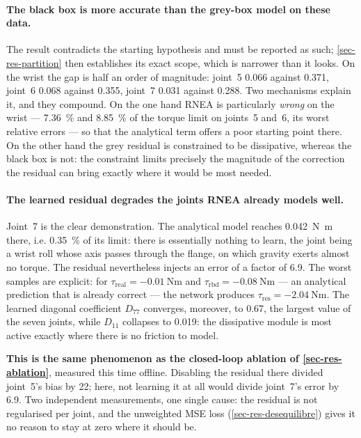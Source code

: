 \documentclass[a4paper, oneside]{article}
\newcommand{\taurbd}{\ensuremath{\tau_{\mathrm{rbd}}}}
\newcommand{\taures}{\ensuremath{\tau_{\mathrm{res}}}}
\begin{document}
\paragraph{The black box is more accurate than the grey-box model on these
data.} The result contradicts the starting hypothesis and must be reported as
such; \cref{sec-res-partition} then establishes its exact scope, which is
narrower than it looks. On the wrist the gap is half an order of magnitude:
joint~5 \num{0.066} against \num{0.371}, joint~6 \num{0.068} against
\num{0.355}, joint~7 \num{0.031} against \num{0.288}. Two mechanisms explain
it, and they compound. On the one hand RNEA is particularly \emph{wrong} on the
wrist --- \SI{7.36}{\percent} and \SI{8.85}{\percent} of the torque limit on
joints~5 and~6, its worst relative errors --- so that the analytical term
offers a poor starting point there. On the other hand the grey residual is
constrained to be dissipative, whereas the black box is not: the constraint
limits precisely the magnitude of the correction the residual can bring exactly
where it would be most needed.

\paragraph{The learned residual degrades the joints RNEA already models well.}
Joint~7 is the clear demonstration. The analytical model reaches
\SI{0.042}{\newton\meter} there, i.e. \SI{0.35}{\percent} of its limit: there
is essentially nothing to learn, the joint being a wrist roll whose axis passes
through the flange, on which gravity exerts almost no torque. The residual
nevertheless injects an error of a factor of \num{6.9}. The worst samples are
explicit: for $\tau_{\mathrm{real}} = \SI{-0.01}{\newton\meter}$ and
$\taurbd = \SI{-0.08}{\newton\meter}$ --- an analytical prediction that is
already correct --- the network produces $\taures =
\SI{-2.04}{\newton\meter}$. The learned diagonal coefficient $D_{77}$ converges,
moreover, to \num{0.67}, the largest value of the seven joints, while $D_{11}$
collapses to \num{0.019}: the dissipative module is most active exactly where
there is no friction to model.

\textbf{This is the same phenomenon as the closed-loop ablation of
\cref{sec-res-ablation}}, measured this time offline. Disabling the residual
there divided joint~5's bias by \num{22}; here, not learning it at all would
divide joint~7's error by \num{6.9}. Two independent measurements, one single
cause: the residual is not regularised per joint, and the unweighted MSE loss
(\cref{sec-res-desequilibre}) gives it no reason to stay at zero where it
should be.
\end{document}
